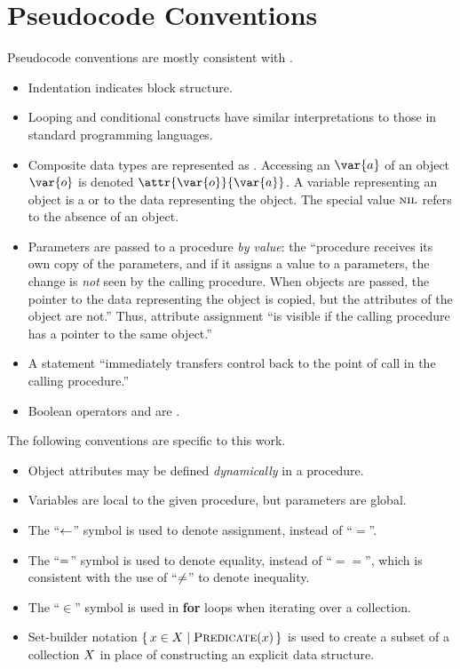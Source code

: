 \chapter{Pseudocode Conventions}\label{ch:pseudocode-conventions}

\newcommand{\vSomeObject}{\var{o}}
\newcommand{\vSomeAttribute}{\var{a}}
\newcommand{\aSomeObjectAttribute}{\attr{\vSomeObject}{\vSomeAttribute}}

Pseudocode conventions are mostly consistent with \citet{Cormen2022}.
%
\begin{itemize}
    \item Indentation indicates block structure.
    \item Looping and conditional constructs have similar interpretations to those in standard programming languages.
    \item Composite data types are represented as . Accessing an  $\vSomeAttribute$ of an object $\vSomeObject$ is denoted
    $\aSomeObjectAttribute$. A variable representing an object is a  or  to the data representing the object. The special value
    $\textsc{nil}$ refers to the absence of an object.
    \item Parameters are passed to a procedure \emph{by value}: the ``procedure receives its own copy of the parameters, and if it assigns a value to a parameters, the change is \emph{not} seen by the calling procedure. When objects are passed, the pointer to the data representing the object is copied, but the attributes of the object are not.'' Thus, attribute assignment ``is visible if the calling procedure has a pointer to the same object.''
    \item A {\Return} statement ``immediately transfers control back to the point of call in the calling procedure.''
    \item Boolean operators {\AND} and {\OR} are .
\end{itemize}
%
The following conventions are specific to this work.
%
\begin{itemize}
    \item Object attributes may be defined \emph{dynamically} in a procedure.
    \item Variables are local to the given procedure, but parameters are global.
    \item The ``$\leftarrow$'' symbol is used to denote assignment, instead of ``$=$''.
    \item The ``$=$'' symbol is used to denote equality, instead of ``$==$'', which is consistent with the use of ``$\neq$'' to denote inequality.
    \item The ``$\in$'' symbol is used in \textbf{for} loops when iterating over a collection.
    \item Set-builder notation $\setBuilder{\vSomeElement \in \vSomeSet}{\cPredicate[\vSomeElement]}$ is used to create a subset of a collection $X$ in place of constructing an explicit data structure.
\end{itemize}
